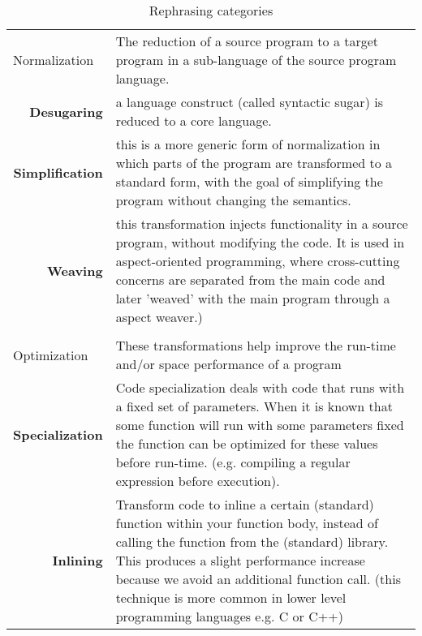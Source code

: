 \begin{table}[h]
\centering
\caption{Rephrasing categories}
\def\arraystretch{1.5}
\label{table-rephrasing-categories}
\begin{tabular}{p{0.2\linewidth}p{0.8\linewidth}}
\multicolumn{1}{l}{Normalization} & The reduction of a source program to a target program in a sub-language of the source program language.                                                                                                                                                                               
\\
\multicolumn{1}{r}{\bf Desugaring}                  & a language construct (called syntactic sugar) is reduced to a core language.                                                    \\
\multicolumn{1}{r}{\bf Simplification}              & this is a more generic form of normalization in which parts of the program are transformed to a standard form, with the goal of simplifying the program without changing the semantics. \\
\multicolumn{1}{r}{\bf Weaving}                     & this transformation injects functionality in a source program, without modifying the code. It is used in aspect-oriented programming, where cross-cutting concerns are separated from the main code and later 'weaved' with the main program through a aspect weaver.)                                                                                                                                                                               \\
\\
\multicolumn{1}{l}{Optimization}  & These transformations help improve the run-time and/or space performance of a program                                                                                         \\
\multicolumn{1}{r}{\bf Specialization}              & Code specialization deals with code that runs with a fixed set of parameters. When it is known that some function will run with some parameters fixed the function can be optimized for these values before run-time. (e.g. compiling a regular expression before execution).                                                                                                                                                                               \\
\multicolumn{1}{r}{\bf Inlining}                    & Transform code to inline a certain (standard) function within your function body, instead of calling the function from the (standard) library. This produces a slight performance increase because we avoid an additional function call. (this technique is more common in lower level programming languages e.g. C or C++)                                                                                                                                                                              \\

\end{tabular}
\end{table}
